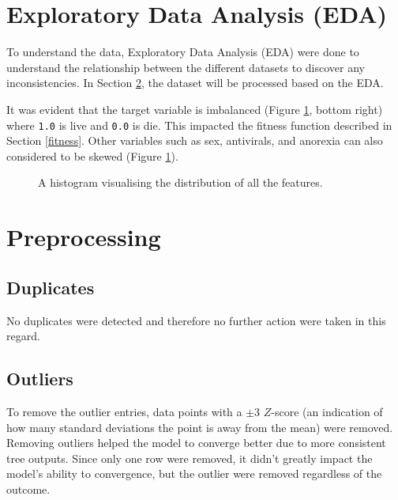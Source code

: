 \documentclass{article}
\begin{document}
\section{Exploratory Data Analysis (EDA)}
\label{EDA}
To understand the data, Exploratory Data Analysis (EDA) were done to understand the relationship between the different datasets to discover any inconsistencies. In Section \ref{preprocessing}, the dataset will be processed based on the EDA.

It was evident that the target variable is imbalanced (Figure \ref{allDist}, bottom right) where \texttt{1.0} is live and \texttt{0.0} is die. This impacted the fitness function described in Section \ref{fitness}. Other variables such as sex, antivirals, and anorexia can also considered to be skewed (Figure \ref{allDist}). 

\begin{figure}[H]
  \caption{A histogram visualising the distribution of all the features.}
  \label{allDist}
\end{figure}

\section{Preprocessing}
\label{preprocessing}
\subsection{Duplicates}
No duplicates were detected and therefore no further action were taken in this regard.

\subsection{Outliers}
To remove the outlier entries, data points with a \(\pm{3}\) \(Z\)-score (an indication of how many standard deviations the point is away from the mean) were removed. Removing outliers helped the model to converge better due to more consistent tree outputs. Since only one row were removed, it didn't greatly impact the model's ability to convergence, but the outlier were removed regardless of the outcome.
\end{document}
